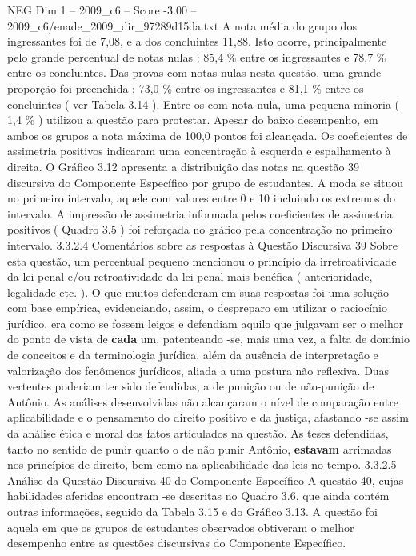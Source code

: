 \begin{textsample}{NEG Dim 1 – 2009\_c6 – Score -3.00 – 2009\_c6/enade\_2009\_dir\_97289d15da.txt}
A nota média do grupo dos ingressantes foi de 7,08, e a dos concluintes 11,88.
Isto ocorre, principalmente pelo grande percentual de notas nulas : 85,4 \% entre os ingressantes e 78,7 \% entre os concluintes.
Das provas com notas nulas nesta questão, uma grande proporção foi preenchida : 73,0 \% entre os ingressantes e 81,1 \% entre os concluintes ( ver Tabela 3.14 ).
Entre os com nota nula, uma pequena minoria ( 1,4 \% ) utilizou a questão para protestar.
Apesar do baixo desempenho, em ambos os grupos a nota máxima de 100,0 pontos foi alcançada.
Os coeficientes de assimetria positivos indicaram uma concentração à esquerda e espalhamento à direita.
O Gráfico 3.12 apresenta a distribuição das notas na questão 39 discursiva do Componente Específico por grupo de estudantes.
A moda se situou no primeiro intervalo, aquele com valores entre 0 e 10 incluindo os extremos do intervalo.
A impressão de assimetria informada pelos coeficientes de assimetria positivos ( Quadro 3.5 ) foi reforçada no gráfico pela concentração no primeiro intervalo. 3.3.2.4 Comentários sobre as respostas à Questão Discursiva 39 Sobre esta questão, um percentual pequeno mencionou o princípio da irretroatividade da lei penal e/ou retroatividade da lei penal mais benéfica ( anterioridade, legalidade etc. ).
O que muitos defenderam em suas respostas foi uma solução com base empírica, evidenciando, assim, o despreparo em utilizar o raciocínio jurídico, era como se fossem leigos e defendiam aquilo que julgavam ser o melhor do ponto de vista de \textbf{cada} um, patenteando -se, mais uma vez, a falta de domínio de conceitos e da terminologia jurídica, além da ausência de interpretação e valorização dos fenômenos jurídicos, aliada a uma postura não reflexiva.
Duas vertentes poderiam ter sido defendidas, a de punição ou de não-punição de Antônio.
As análises desenvolvidas não alcançaram o nível de comparação entre aplicabilidade e o pensamento do direito positivo e da justiça, afastando -se assim da análise ética e moral dos fatos articulados na questão.
As teses defendidas, tanto no sentido de punir quanto o de não punir Antônio, \textbf{estavam} arrimadas nos princípios de direito, bem como na aplicabilidade das leis no tempo. 3.3.2.5 Análise da Questão Discursiva 40 do Componente Específico A questão 40, cujas habilidades aferidas encontram -se descritas no Quadro 3.6, que ainda contém outras informações, seguido da Tabela 3.15 e do Gráfico 3.13.
A questão foi aquela em que os grupos de estudantes observados obtiveram o melhor desempenho entre as questões discursivas do Componente Específico.

\end{textsample}
